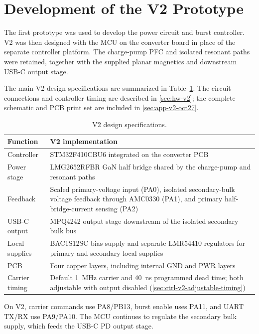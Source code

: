 \section{Development of the V2 Prototype}
\label{sec:intro-v2}

The first prototype was used to develop the power circuit and burst
controller. V2 was then designed with the MCU on the converter board in place of
the separate controller platform. The charge-pump
PFC and isolated resonant paths were retained, together with the supplied
planar magnetics and downstream USB-C output stage.

The main V2 design specifications are summarized in
Table~\ref{tab:intro-v2-specs}. The circuit connections and controller
timing are described in \cref{sec:hw-v2}; the complete schematic and PCB
print set are included in \cref{sec:app-v2-oct27}.

\begin{table}[htbp]
\centering
\caption{V2 design specifications.}
\label{tab:intro-v2-specs}
\small
\begin{tabularx}{\textwidth}{@{}p{}X@{}}
\toprule
Function & V2 implementation\\
\midrule
Controller & STM32F410CBU6 integrated on the converter PCB\\
Power stage & LMG2652RFBR GaN half bridge shared by the charge-pump and resonant paths\\
Feedback & Scaled primary-voltage input (PA0), isolated secondary-bulk voltage feedback through AMC0330 (PA1), and primary half-bridge-current sensing (PA2)\\
USB-C output & MPQ4242 output stage downstream of the isolated secondary bulk bus\\
Local supplies & BAC1S12SC bias supply and separate LMR54410 regulators for primary and secondary local supplies\\
PCB & Four copper layers, including internal GND and PWR layers\\
Carrier timing & Default \SI{1}{\mega\hertz} carrier and \SI{40}{\nano\second} programmed dead time; both adjustable with output disabled (\cref{sec:ctrl-v2-adjustable-timing})\\
\bottomrule
\end{tabularx}
\end{table}

On V2, carrier commands use PA8/PB13, burst enable uses PA11, and UART
TX/RX use PA9/PA10. The MCU continues to regulate the secondary bulk supply,
which feeds the USB-C PD output stage.

